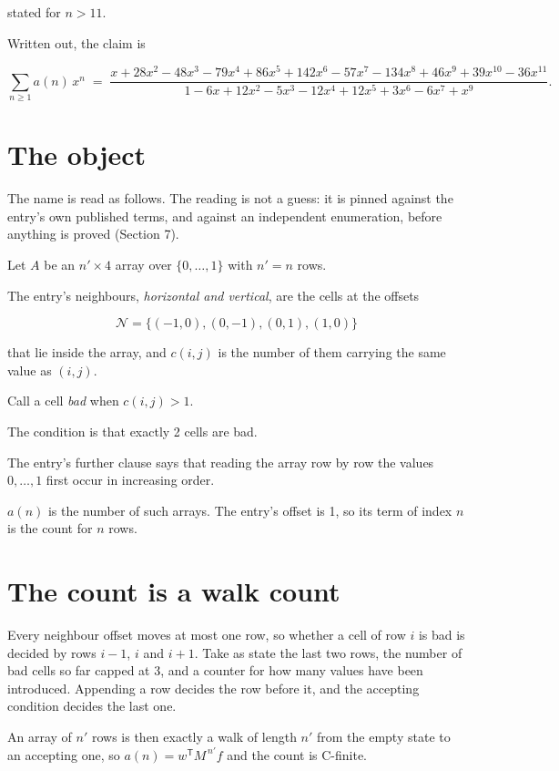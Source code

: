 \documentclass[11pt]{article}
\theoremstyle{definition}
\begin{document}
stated for $n > 11$.

Written out, the claim is

\[\sum_{n \ge 1} a(n)\,x^n \;=\; \frac{x + 28x^{2} - 48x^{3} - 79x^{4} + 86x^{5} + 142x^{6} - 57x^{7} - 134x^{8} + 46x^{9} + 39x^{10} - 36x^{11}}{1 - 6x + 12x^{2} - 5x^{3} - 12x^{4} + 12x^{5} + 3x^{6} - 6x^{7} + x^{9}}.\]

\section{The object}

The name is read as follows. The reading is not a guess: it is pinned against the entry's own published terms, and against an independent enumeration, before anything is proved (Section 7).

Let $A$ be an $n' \times 4$ array over $\{0,\dots,1\}$ with $n' = n$ rows.

The entry's neighbours, {\itshape horizontal and vertical}, are the cells at the offsets

\[\mathcal{N} = \{(-1,0), (0,-1), (0,1), (1,0)\}\]

that lie inside the array, and $c(i,j)$ is the number of them carrying the same value as $(i,j)$.

Call a cell {\itshape bad} when $c(i,j) > 1$.

The condition is that exactly 2 cells are bad.

The entry's further clause says that reading the array row by row the values $0,\dots,1$ first occur in increasing order.

$a(n)$ is the number of such arrays. The entry's offset is 1, so its term of index $n$ is the count for $n$ rows.

\section{The count is a walk count}

Every neighbour offset moves at most one row, so whether a cell of row $i$ is bad is decided by rows $i-1$, $i$ and $i+1$. Take as state the last two rows, the number of bad cells so far capped at 3, and a counter for how many values have been introduced. Appending a row decides the row before it, and the accepting condition decides the last one.

An array of $n'$ rows is then exactly a walk of length $n'$ from the empty state to an accepting one, so $a(n) = w^{\mathsf T}M^{\,n'}f$ and the count is C-finite.
\end{document}
